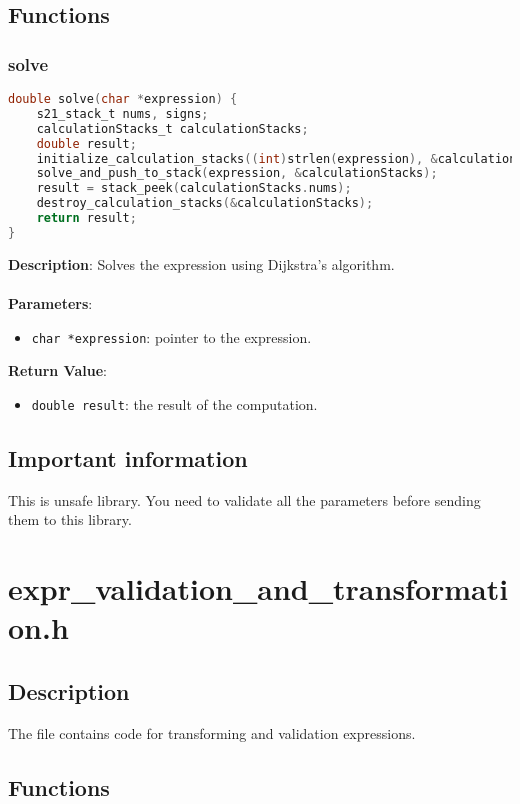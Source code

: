 \documentclass{article}
\begin{document}
\subsection{Functions}
\subsubsection{solve}
\begin{lstlisting}[language=C]
double solve(char *expression) {
    s21_stack_t nums, signs;
    calculationStacks_t calculationStacks;
    double result;
    initialize_calculation_stacks((int)strlen(expression), &calculationStacks, &nums, &signs);
    solve_and_push_to_stack(expression, &calculationStacks);
    result = stack_peek(calculationStacks.nums);
    destroy_calculation_stacks(&calculationStacks);
    return result;
}
\end{lstlisting}
\noindent
\textbf{Description}: Solves the expression using Dijkstra's algorithm.\\\\
\textbf{Parameters}:
\begin{itemize}
    \item \texttt{char *expression}: pointer to the expression.
\end{itemize}
\textbf{Return Value}:
\begin{itemize}
    \item \texttt{double result}: the result of the computation.
\end{itemize}

\subsection{Important information}
This is unsafe library. You need to validate all the parameters before sending them to this library.

\section{expr\_validation\_and\_transformation.h}
\subsection{Description}
The file contains code for transforming and validation expressions.

\subsection{Functions}
\end{document}
